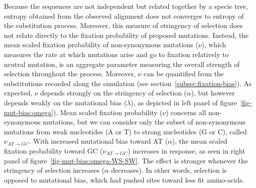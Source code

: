
Because the sequences are not independent but related together by a specie tree, entropy obtained from the observed alignment does not converges to entropy of the \gls{substitution} process.
Moreover, this measure of stringency of selection does not relate directly to the fixation probability of proposed mutations.
Instead, the mean scaled fixation probability of non-synonymous mutations ($\nu$), which measures the rate at which mutations arise and go to fixation relatively to neutral mutation, is an aggregate parameter measuring the overall strength of selection throughout the process.
Moreover, $\nu$ can be quantified from the \glspl{substitution} recorded along the simulation (see section~\ref{subsec:fixation-bias}).
As expected, $\nu$ depends strongly on the stringency of selection ($\alpha$), but however depends weakly on the mutational bias ($\lambda$), as depicted in left panel of figure~\ref{fig-mut-bias:omega}).
Mean scaled fixation probability ($\nu$) concerns all non-synonymous mutations, but we can consider only the subset of non-synonymous mutations from weak nucleotides (A or T) to strong nucleotides (G or C), called $\nu_{AT \rightarrow GC}$.
With increased mutational bias toward AT ($\alpha$), the mean scaled fixation probability toward GC ($\nu_{AT \rightarrow GC}$) increases in response, as seen in right panel of figure~\ref{fig-mut-bias:omega-WS-SW}.
The effect is stronger whenever the stringency of selection increases ($\alpha$ decreases).
In other words, selection is opposed to mutational bias, which had pushed sites toward less fit amino-acids.

